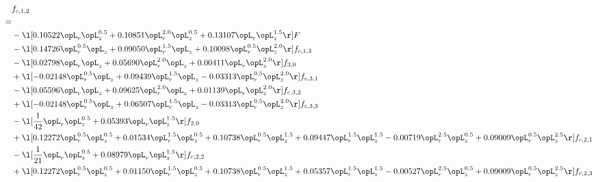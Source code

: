 \begin{alignat}{2} 
\label{eq:f_12_2} 
& f_{c,1,2} \nonumber \\ 
 = \\ 
& - \l[  0.10522 \opL_r \opL_z^{0.5} +  0.10851 \opL_r^{2.0} \opL_z^{0.5} +  0.13107 \opL_r \opL_z^{1.5}  \r] F \nonumber \\ 
& - \l[  0.14726 \opL_r^{0.5} \opL_z +  0.09050 \opL_r^{1.5} \opL_z +  0.10098 \opL_r^{0.5} \opL_z^{2.0}  \r] f_{c,1,3} \nonumber \\ 
& - \l[  0.02798 \opL_r \opL_z +  0.05690 \opL_r^{2.0} \opL_z +  0.00411 \opL_r \opL_z^{2.0}  \r] f_{3,0} \nonumber \\ 
& + \l[  -0.02148 \opL_r^{0.5} \opL_z +  0.09439 \opL_r^{1.5} \opL_z   -0.03313 \opL_r^{0.5} \opL_z^{2.0}  \r] f_{c,3,1} \nonumber \\ 
& - \l[  0.05596 \opL_r \opL_z +  0.09625 \opL_r^{2.0} \opL_z +  0.01139 \opL_r \opL_z^{2.0}  \r] f_{c,3,2} \nonumber \\ 
& + \l[  -0.02148 \opL_r^{0.5} \opL_z +  0.06507 \opL_r^{1.5} \opL_z   -0.03313 \opL_r^{0.5} \opL_z^{2.0}  \r] f_{c,3,3} \nonumber \\ 
& - \l[ \frac{1}{42} \opL_r \opL_z^{0.5} +  0.05393 \opL_r \opL_z^{1.5}  \r] f_{2,0} \nonumber \\ 
& + \l[  0.12272 \opL_r^{0.5} \opL_z^{0.5} +  0.01534 \opL_r^{1.5} \opL_z^{0.5} +  0.10738 \opL_r^{0.5} \opL_z^{1.5} +  0.09447 \opL_r^{1.5} \opL_z^{1.5}   -0.00719 \opL_r^{2.5} \opL_z^{0.5} +  0.09009 \opL_r^{0.5} \opL_z^{2.5}  \r] f_{c,2,1} \nonumber \\ 
& - \l[ \frac{1}{21} \opL_r \opL_z^{0.5} +  0.08979 \opL_r \opL_z^{1.5}  \r] f_{c,2,2} \nonumber \\ 
& + \l[  0.12272 \opL_r^{0.5} \opL_z^{0.5} +  0.01150 \opL_r^{1.5} \opL_z^{0.5} +  0.10738 \opL_r^{0.5} \opL_z^{1.5} +  0.05357 \opL_r^{1.5} \opL_z^{1.5}   -0.00527 \opL_r^{2.5} \opL_z^{0.5} +  0.09009 \opL_r^{0.5} \opL_z^{2.5}  \r] f_{c,2,3} \nonumber \\ 
\end{alignat} 


